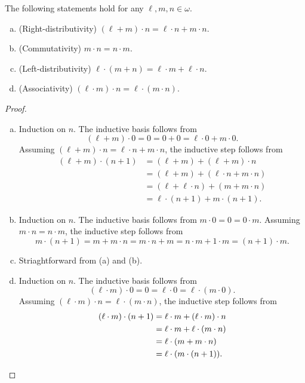 \documentclass[11pt]{article}
\begin{document}
\begin{theorem}
  The following statements hold for any $\ell, m, n \in \omega$.
  \begin{enumerate}[(a)]
    \item (Right-distributivity) $(\ell + m) \cdot n = \ell \cdot n + m \cdot n$.
    \item (Commutativity) $m \cdot n = n \cdot m$.
    \item (Left-distributivity) $\ell \cdot (m + n) = \ell \cdot m + \ell \cdot n$.
    \item (Associativity) $(\ell \cdot m) \cdot n = \ell \cdot (m \cdot n)$.
  \end{enumerate}
\end{theorem}
\begin{proof}
  \leavevmode
  \begin{enumerate}[(a)]
    \item Induction on $n$.
    The inductive basis follows from
    \begin{equation*}
      (\ell + m) \cdot 0 = 0 = 0 + 0 = \ell \cdot 0 + m \cdot 0.
    \end{equation*}
    Assuming $(\ell + m) \cdot n = \ell \cdot n + m \cdot n$, the inductive step follows from
    \begin{align*}
      (\ell + m) \cdot (n + 1)
      &= (\ell + m) + (\ell + m) \cdot n \\
      &= (\ell + m) + (\ell \cdot n + m \cdot n) \\
      &= (\ell + \ell \cdot n) + (m + m \cdot n) \\
      &= \ell \cdot (n + 1) + m \cdot (n + 1).
    \end{align*}
    \item Induction on $n$.
    The inductive basis follows from $m \cdot 0 = 0 = 0 \cdot m$.
    Assuming $m \cdot n = n \cdot m$, the inductive step follows from
    \begin{equation*}
      m \cdot (n + 1)
      = m + m \cdot n
      = m \cdot n + m
      = n \cdot m + 1 \cdot m
      = (n + 1) \cdot m.
    \end{equation*}
    \item Striaghtforward from (a) and (b).
    \item Induction on $n$.
    The inductive basis follows from
    \begin{equation*}
      (\ell \cdot m) \cdot 0
      = 0
      = \ell \cdot 0
      = \ell \cdot (m \cdot 0).
    \end{equation*}
    Assuming $(\ell \cdot m) \cdot n = \ell \cdot (m \cdot n)$, the inductive step follows from
    \begin{align*}
      (\ell \cdot m) \cdot (n + 1)
      &= \ell \cdot m + (\ell \cdot m) \cdot n \\
      &= \ell \cdot m + \ell \cdot (m \cdot n) \\
      &= \ell \cdot (m + m \cdot n) \\
      &= \ell \cdot (m \cdot (n + 1)).
      \qedhere
    \end{align*}
  \end{enumerate}
\end{proof}
\end{document}
